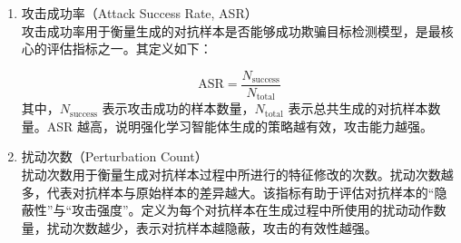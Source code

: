 
\begin{enumerate}[label=\arabic*)]
	\item 攻击成功率（Attack Success Rate, ASR） \\
	攻击成功率用于衡量生成的对抗样本是否能够成功欺骗目标检测模型，是最核心的评估指标之一。其定义如下：

	\begin{equation}
		\text{ASR} = \frac{N_{\text{success}}}{N_{\text{total}}}
		\tag{5.5}
	\end{equation}
	其中，$N_{\text{success}}$ 表示攻击成功的样本数量，$N_{\text{total}}$ 表示总共生成的对抗样本数量。ASR 越高，说明强化学习智能体生成的策略越有效，攻击能力越强。

	
	\item 扰动次数（Perturbation Count） \\
	扰动次数用于衡量生成对抗样本过程中所进行的特征修改的次数。扰动次数越多，代表对抗样本与原始样本的差异越大。该指标有助于评估对抗样本的“隐蔽性”与“攻击强度”。定义为每个对抗样本在生成过程中所使用的扰动动作数量，扰动次数越少，表示对抗样本越隐蔽，攻击的有效性越强。

	

\end{enumerate}

